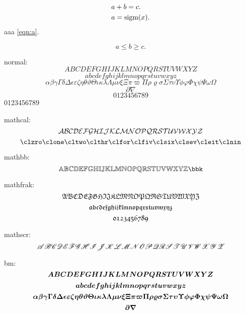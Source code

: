 \documentclass{article}
\begin{document}
\begin{align}
  & a + b = c. \\
  & a = \mathrm{sigm}(x).
  \label{eqn:a}
\end{align}
aaa \eqref{eqn:a}. \ie{} \eg{} \etc{} \etal

\[
  a \le b \ge c.
\]

normal:
\[ A B C D E F G H I J K L M N O P Q R S T U V W X Y Z \]
\[ a b c d e f g h i j k l m n o p q r s t u v w x y z \]
\[ \alpha \beta \gamma \Gamma \delta \Delta \epsilon \varepsilon \zeta \eta \theta \vartheta \Theta \iota \kappa \lambda \Lambda \mu \nu \xi \Xi \pi \varpi \Pi \rho \varrho \sigma \Sigma \tau \upsilon \Upsilon \phi \varphi \Phi \chi \psi \Psi \omega \Omega \]
\[ \partial \nabla \]
\[0123456789\]
0123456789

mathcal:
\[ \mathcal{A} \mathcal{B} \mathcal{C} \mathcal{D} \mathcal{E} \mathcal{F} \mathcal{G} \mathcal{H} \mathcal{I} \mathcal{J} \mathcal{K} \mathcal{L} \mathcal{M} \mathcal{N} \mathcal{O} \mathcal{P} \mathcal{Q} \mathcal{R} \mathcal{S} \mathcal{T} \mathcal{U} \mathcal{V} \mathcal{W} \mathcal{X} \mathcal{Y} \mathcal{Z} \]
\[ \clzro \clone \cltwo \clthr \clfor \clfiv \clsix \clsev \cleit \clnin \]

mathbb:
\[ \bbA \bbB \bbC \bbD \bbE \bbF \bbG \bbH \bbI \bbJ \bbK \bbL \bbM \bbN \bbO \bbP \bbQ \bbR \bbS \bbT \bbU \bbV \bbW \bbX \bbY \bbZ \bbk \]

mathfrak:
\[ \mathfrak{A} \mathfrak{B} \mathfrak{C} \mathfrak{D} \mathfrak{E} \mathfrak{F} \mathfrak{G} \mathfrak{H} \mathfrak{I} \mathfrak{J} \mathfrak{K} \mathfrak{L} \mathfrak{M} \mathfrak{N} \mathfrak{O} \mathfrak{P} \mathfrak{Q} \mathfrak{R} \mathfrak{S} \mathfrak{T} \mathfrak{U} \mathfrak{V} \mathfrak{W} \mathfrak{X} \mathfrak{Y} \mathfrak{Z} \]
\[ \mathfrak{a} \mathfrak{b} \mathfrak{c} \mathfrak{d} \mathfrak{e} \mathfrak{f} \mathfrak{g} \mathfrak{h} \mathfrak{i} \mathfrak{j} \mathfrak{k} \mathfrak{l} \mathfrak{m} \mathfrak{n} \mathfrak{o} \mathfrak{p} \mathfrak{q} \mathfrak{r} \mathfrak{s} \mathfrak{t} \mathfrak{u} \mathfrak{v} \mathfrak{w} \mathfrak{x} \mathfrak{y} \mathfrak{z} \]
\[ \mathfrak{0} \mathfrak{1} \mathfrak{2} \mathfrak{3} \mathfrak{4} \mathfrak{5} \mathfrak{6} \mathfrak{7} \mathfrak{8} \mathfrak{9} \]

mathscr:
\[ \mathscr{A} \mathscr{B} \mathscr{C} \mathscr{D} \mathscr{E} \mathscr{F} \mathscr{G} \mathscr{H} \mathscr{I} \mathscr{J} \mathscr{K} \mathscr{L} \mathscr{M} \mathscr{N} \mathscr{O} \mathscr{P} \mathscr{Q} \mathscr{R} \mathscr{S} \mathscr{T} \mathscr{U} \mathscr{V} \mathscr{W} \mathscr{X} \mathscr{Y} \mathscr{Z} \]

bm:
\[ \bm{A} \bm{B} \bm{C} \bm{D} \bm{E} \bm{F} \bm{G} \bm{H} \bm{I} \bm{J} \bm{K} \bm{L} \bm{M} \bm{N} \bm{O} \bm{P} \bm{Q} \bm{R} \bm{S} \bm{T} \bm{U} \bm{V} \bm{W} \bm{X} \bm{Y} \bm{Z} \]
\[ \bm{a} \bm{b} \bm{c} \bm{d} \bm{e} \bm{f} \bm{g} \bm{h} \bm{i} \bm{j} \bm{k} \bm{l} \bm{m} \bm{n} \bm{o} \bm{p} \bm{q} \bm{r} \bm{s} \bm{t} \bm{u} \bm{v} \bm{w} \bm{x} \bm{y} \bm{z} \]
\[ \bm{\alpha} \bm{\beta} \bm{\gamma} \bm{\Gamma} \bm{\delta} \bm{\Delta} \bm{\epsilon} \bm{\varepsilon} \bm{\zeta} \bm{\eta} \bm{\theta} \bm{\vartheta} \bm{\Theta} \bm{\iota} \bm{\kappa} \bm{\lambda} \bm{\Lambda} \bm{\mu} \bm{\nu} \bm{\xi} \bm{\Xi} \bm{\pi} \bm{\varpi} \bm{\Pi} \bm{\rho} \bm{\varrho} \bm{\sigma} \bm{\Sigma} \bm{\tau} \bm{\upsilon} \bm{\Upsilon} \bm{\phi} \bm{\varphi} \bm{\Phi} \bm{\chi} \bm{\psi} \bm{\Psi} \bm{\omega} \bm{\Omega} \]
\[ \bm{\partial} \bm{\nabla} \]
\end{document}

